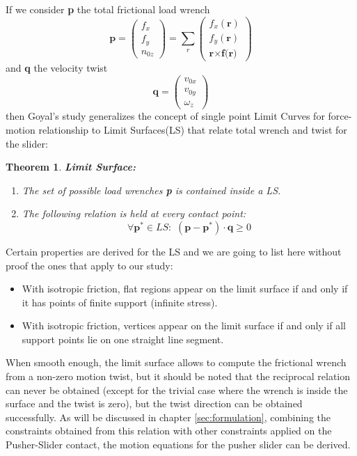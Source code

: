 \documentclass[12,twoside]{TFG-GM}
\newtheorem{theorem}{Theorem}[section]
\theoremstyle{definition}
\theoremstyle{remark}
\begin{document}
If we consider \textbf{p} the total frictional load wrench
$$ \textbf{p} =
  \begin{pmatrix}
    f_x \\
    f_y \\
    n_{0z}
  \end{pmatrix} = \sum_r \begin{pmatrix}
    f_x(\textbf{r}) \\
    f_y(\textbf{r})\\
    \textbf{r} \times \textbf{f(r)}
  \end{pmatrix}   $$
and \textbf{q} the velocity twist
$$ \textbf{q} =
  \begin{pmatrix}
  v_{0x} \\
  v_{0y} \\
  \omega_z
  \end{pmatrix}
$$
then Goyal's study generalizes the concept of single point Limit Curves for force-motion relationship to Limit Surfaces(LS) that relate total wrench and twist for the slider:
\begin{theorem} \textbf{Limit Surface:}


\begin{enumerate}
\item The set of possible load wrenches \textbf{p} is contained inside a LS.
\item The following relation is held at every contact point:
\begin{equation}
 \forall \textbf{p}^* \in LS: \,\, (\textbf{p} - \textbf{p}^*)\cdot \textbf{q} \geq 0 
\end{equation}
\end{enumerate}
\end{theorem}

Certain properties are derived for the LS and we are going to list here without proof the ones that apply to our study:
\begin{itemize}
\item With isotropic friction, flat regions appear on the limit surface if
and only if it has points of finite support (infinite stress).
\item With isotropic friction, vertices appear on the limit surface if and
only if all support points lie on one straight line segment.
\end{itemize}

When smooth enough, the limit surface allows to compute the frictional wrench from a non-zero motion twist, but it should be noted that the reciprocal relation can never be obtained (except for the trivial case where the wrench is inside the surface and the twist is zero), but the twist direction can be obtained successfully. As will be discussed in chapter \ref{sec:formulation}, combining the constraints obtained from this relation with other constraints applied on the Pusher-Slider contact, the motion equations for the pusher slider can be derived.
\end{document}
